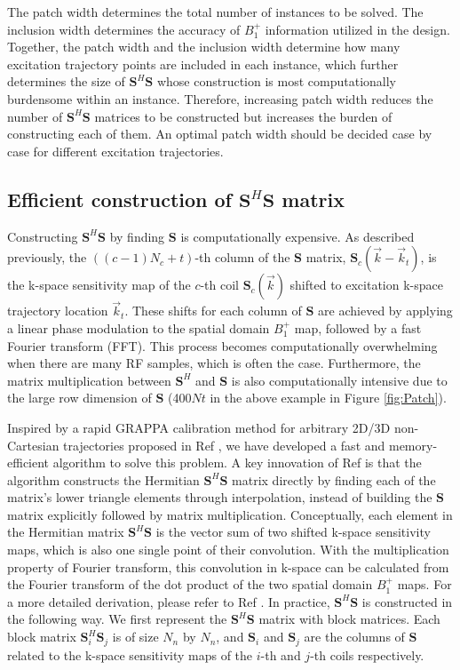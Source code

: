 \par The patch width determines the total number of instances to be solved. The inclusion width determines the accuracy of $B_1^+$ information utilized in the design. Together, the patch width and the inclusion width determine how many excitation trajectory points are included in each instance, which further determines the size of $\mathbf{S}^{H}\mathbf{S}$ whose construction is most computationally burdensome within an instance. Therefore, increasing patch width reduces the number of $\mathbf{S}^{H}\mathbf{S}$ matrices to be constructed but increases the burden of constructing each of them. An optimal patch width should be decided case by case for different excitation trajectories. 

\subsection*{Efficient construction of $\mathbf{S}^{H}\mathbf{S}$ matrix}
\par Constructing $\mathbf{S}^{H}\mathbf{S}$ by finding $\mathbf{S}$ is computationally expensive. As described previously, the $((c-1)N_c+t)$-th column of the  $\mathbf{S}$ matrix, $\mathbf{S}_c(\vec{k}-\vec{k}_t)$, is the k-space sensitivity map of the $c$-th coil $\mathbf{S}_c(\vec{k})$ shifted to excitation k-space trajectory location $\vec{k}_t$. These shifts for each column of $\mathbf{S}$ are achieved by applying a linear phase modulation to the spatial domain $B_1^+$ map, followed by a fast Fourier transform (FFT). This process becomes computationally overwhelming when there are many RF samples, which is often the case. Furthermore, the matrix multiplication between $\mathbf{S}^{H}$ and $\mathbf{S}$ is also computationally intensive due to the large row dimension of $\mathbf{S}$ (400$Nt$ in the above example in Figure \ref{fig:Patch}).  


\par Inspired by a rapid GRAPPA calibration method for arbitrary 2D/3D non-Cartesian trajectories proposed in Ref \cite{luo2019grappa}, we have developed a fast and memory-efficient algorithm to solve this problem. A key innovation of Ref \cite{luo2019grappa} is that the algorithm constructs the Hermitian $\mathbf{S}^{H}\mathbf{S}$ matrix directly by finding each of the matrix's lower triangle elements through interpolation, instead of building the $\mathbf{S}$ matrix explicitly followed by matrix multiplication. Conceptually, each element in the Hermitian matrix $\mathbf{S}^{H}\mathbf{S}$ is the vector sum of two shifted k-space sensitivity maps, which is also one single point of their convolution. With the multiplication property of Fourier transform, this convolution in k-space can be calculated from the Fourier transform of the dot product of the two spatial domain $B_1^+$ maps. For a more detailed derivation, please refer to Ref \cite{luo2019grappa}.
In practice, $\mathbf{S}^{H}\mathbf{S}$ is constructed in the following way. We first represent the $\mathbf{S}^{H}\mathbf{S}$ matrix with block matrices. Each block matrix $\mathbf{S}_i^{H}\mathbf{S}_j$ is of size $N_n$ by $N_n$, and $\mathbf{S}_i$ and $\mathbf{S}_j$ are the columns of $\mathbf{S}$ related to the k-space sensitivity maps of the $i$-th and $j$-th coils respectively.

